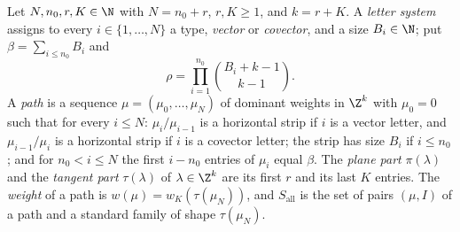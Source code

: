 \begin{definition}\label{pf:linkG:paths}
Let $N,n_0,r,K\in\N$ with $N=n_0+r$, $r,K\ge1$, and $k=r+K$. A \emph{letter system} assigns to every $i\in\{1,\dots,N\}$ a type,
\emph{vector} or \emph{covector}, and a size $B_i\in\N$; put $\beta=\sum_{i\le n_0}B_i$ and
\[
\rho=\prod_{i=1}^{n_0}\binom{B_i+k-1}{k-1}.
\]
A \emph{path} is a sequence $\mu=(\mu_0,\dots,\mu_N)$ of dominant weights in $\Z^k$ with $\mu_0=0$ such that for every
$i\le N$: $\mu_i/\mu_{i-1}$ is a horizontal strip if $i$ is a vector letter, and $\mu_{i-1}/\mu_i$ is a horizontal strip if
$i$ is a covector letter; the strip has size $B_i$ if $i\le n_0$; and for $n_0<i\le N$ the first $i-n_0$ entries of $\mu_i$
equal $\beta$. The \emph{plane part} $\pi(\lambda)$ and the \emph{tangent part} $\tau(\lambda)$ of $\lambda\in\Z^k$ are its first $r$
and its last $K$ entries. The \emph{weight} of a path is $w(\mu)=w_K(\tau(\mu_N))$, and $S_{\mathrm{all}}$ is the set of pairs
$(\mu,I)$ of a path and a standard family of shape $\tau(\mu_N)$.


\end{definition}
